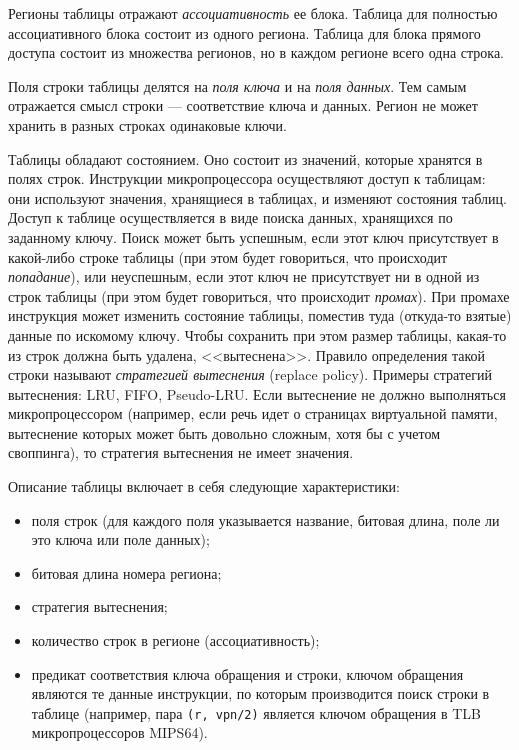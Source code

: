 \documentclass[14pt]{extreport}
\newcommand{\LRU}{\textsf{LRU}\xspace}
\newcommand{\FIFO}{\textsf{FIFO}\xspace}
\newcommand{\PseudoLRU}{\textsf{Pseudo-LRU}\xspace}
\begin{document}
Регионы таблицы отражают \emph{ассоциативность} ее блока. Таблица для полностью ассоциативного блока состоит из одного региона. Таблица для блока прямого доступа состоит из множества регионов, но в каждом регионе всего одна строка.

Поля строки таблицы делятся на \emph{поля ключа} и на \emph{поля данных}. Тем самым отражается смысл строки --- соответствие ключа и данных. Регион не может хранить в разных строках одинаковые ключи.

Таблицы обладают состоянием. Оно состоит из значений, которые хранятся в полях строк. Инструкции микропроцессора осуществляют доступ к таблицам: они используют значения, хранящиеся в таблицах, и изменяют состояния таблиц. Доступ к таблице осуществляется в виде поиска данных, хранящихся по заданному ключу. Поиск может быть успешным, если этот ключ присутствует в какой-либо строке таблицы (при этом будет говориться, что происходит \emph{попадание}), или неуспешным, если этот ключ не присутствует ни в одной из строк таблицы (при этом будет говориться, что происходит \emph{промах}). При промахе инструкция может изменить состояние таблицы, поместив туда (откуда-то взятые) данные по искомому ключу. Чтобы сохранить при этом размер таблицы, какая-то из строк должна быть удалена, <<вытеснена>>. Правило определения такой строки называют \emph{стратегией вытеснения} (replace policy). Примеры стратегий вытеснения: \LRU, \FIFO, \PseudoLRU. Если вытеснение не должно выполняться микропроцессором (например, если речь идет о страницах виртуальной памяти, вытеснение которых может быть довольно сложным, хотя бы с учетом своппинга), то стратегия вытеснения не имеет значения.

Описание таблицы включает в себя следующие характеристики:
\begin{itemize}
    \item поля строк (для каждого поля указывается название, битовая длина, поле ли это ключа или поле данных);
    \item битовая длина номера региона;
    \item стратегия вытеснения;
    \item количество строк в регионе (ассоциативность);
    \item предикат соответствия ключа обращения и строки, ключом обращения являются те данные инструкции, по которым производится поиск строки в таблице (например, пара \texttt{(r, vpn/2)} является ключом обращения в TLB микропроцессоров MIPS64).
\end{itemize}
\end{document}
